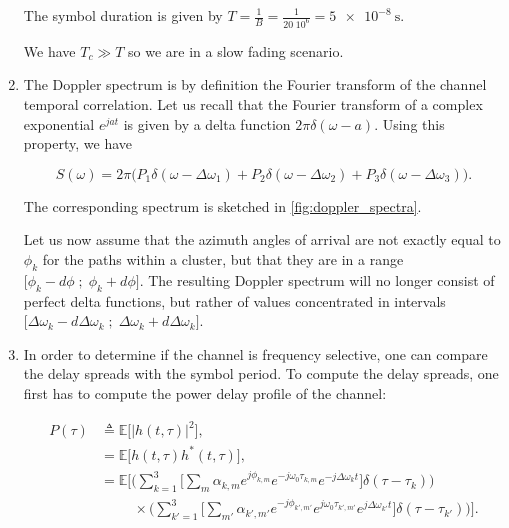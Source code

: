 \documentclass [a4paper, 11pt] {article}
\begin{document}
\begin{solution}
\begin{enumerate}
        The symbol duration is given by $T=\frac{1}{B} = \frac{1}{20 \; 10^6} = \SI{5e-8}{\second}$.
        
        We have $T_c \gg T$ so we are in a slow fading scenario. 
        
        
        \item The Doppler spectrum is by definition the Fourier transform of the channel temporal correlation. Let us recall that the Fourier transform of a complex exponential $e^{jat}$ is given by a delta function $2\pi \delta(\omega - a)$. Using this property, we have 
        
        \begin{equation}
            S(\omega) =2\pi \bigg(P_1 \delta(\omega - \Delta \omega_1) + P_2 \delta(\omega - \Delta \omega_2) + P_3 \delta(\omega - \Delta \omega_3) \bigg).
        \end{equation}
        
        The corresponding spectrum is sketched in \autoref{fig:doppler_spectra}.
        
        
        
        Let us now assume that the azimuth angles of arrival are not exactly equal to $\phi_k$ for the paths within a cluster, but that they are in a range $\big[\phi_k-d\phi \; ; \; \phi_k+d\phi \big]$. The resulting Doppler spectrum will no longer consist of perfect delta functions, but rather of values concentrated in intervals $\big[\Delta \omega_k-d \Delta \omega_k  \; ; \; \Delta \omega_k+d \Delta \omega_k  \big]$.
        
        \item In order to determine if the channel is frequency selective, one can compare the delay spreads with the symbol period. To compute the delay spreads, one first has to compute the power delay profile of the channel:
        
        \begin{align}
            P(\tau) &\triangleq \mathbb{E}\Big[|h(t,\tau)|^2\Big], \\
            &= \mathbb{E}\Big[h(t,\tau)h^*(t,\tau)\Big],\\
            &= \mathbb{E}\Bigg[\Big( \sum_{k=1}^{3} \Big[ \sum_m \alpha_{k,m} e^{j\phi_{k,m}}e^{-j\omega_0 \tau_{k,m}}e^{-j\Delta \omega_{k} t}\Big] \delta(\tau-\tau_k) \Big) \\
            &\hspace{1cm}\times\Big( \sum_{k'=1}^{3} \Big[ \sum_{m'} \alpha_{k',m'} e^{-j\phi_{k',m'}}e^{j\omega_0 \tau_{k',m'}}e^{j\Delta \omega_{k'} t}\Big] \delta(\tau-\tau_{k'})\Big) \Bigg]\nonumber.
        \end{align}
        

\end{enumerate}
\end{solution}
\end{document}
